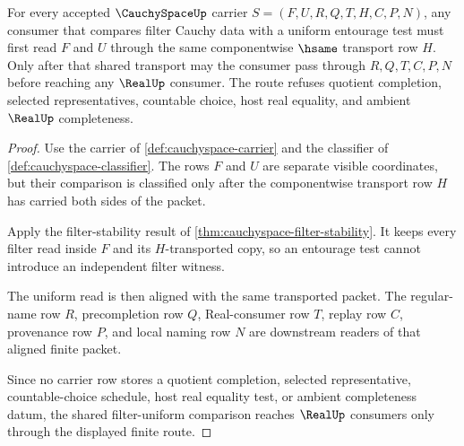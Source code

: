 \begin{theorem}
\label{thm:cauchyspace-filter-uniform-compatibility}
For every accepted $\CauchySpaceUp$ carrier $S=(F,U,R,Q,T,H,C,P,N)$, any consumer that compares filter Cauchy data with a uniform entourage test must first read $F$ and $U$ through the same componentwise $\hsame$ transport row $H$. Only after that shared transport may the consumer pass through $R,Q,T,C,P,N$ before reaching any $\RealUp$ consumer. The route refuses quotient completion, selected representatives, countable choice, host real equality, and ambient $\RealUp$ completeness.
\end{theorem}
\begin{proof}
Use the carrier of \autoref{def:cauchyspace-carrier} and the classifier of \autoref{def:cauchyspace-classifier}. The rows $F$ and $U$ are separate visible coordinates, but their comparison is classified only after the componentwise transport row $H$ has carried both sides of the packet.

Apply the filter-stability result of \autoref{thm:cauchyspace-filter-stability}. It keeps every filter read inside $F$ and its $H$-transported copy, so an entourage test cannot introduce an independent filter witness.

The uniform read is then aligned with the same transported packet. The regular-name row $R$, precompletion row $Q$, Real-consumer row $T$, replay row $C$, provenance row $P$, and local naming row $N$ are downstream readers of that aligned finite packet.

Since no carrier row stores a quotient completion, selected representative, countable-choice schedule, host real equality test, or ambient completeness datum, the shared filter-uniform comparison reaches $\RealUp$ consumers only through the displayed finite route.
\end{proof}

